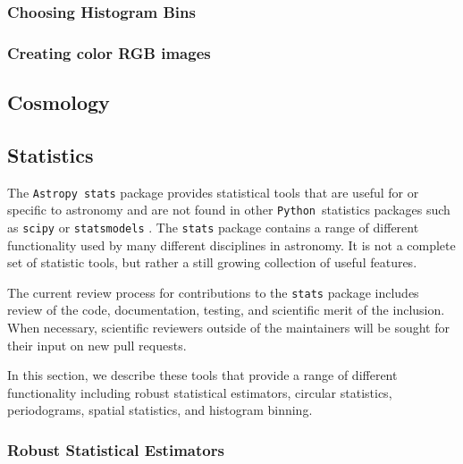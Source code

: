 \documentclass[modern]{aastex61}
\newcommand{\package}[1]{\texttt{#1}}
\newcommand{\python}{\package{Python}}
\newcommand{\astropypkg}{\package{Astropy}}
\begin{document}
\subsubsection{Choosing Histogram Bins}

\subsubsection{Creating color RGB images}


\subsection{Cosmology}


\subsection{Statistics}

The \astropypkg\ \package{stats} package provides
statistical tools that are useful for or specific to
astronomy and are not found in other \python\
statistics packages such as \package{scipy}
\citep{scipy} or \package{statsmodels}
\citep{seabold2010statsmodels}.   The
\package{stats} package contains a range of
different functionality used by many different
disciplines in astronomy.   It is not a complete set
of statistic tools, but rather a still growing
collection of useful features.

The current review process for contributions to the \package{stats} package includes review of the code, documentation, testing, and scientific merit of the inclusion.  When necessary, scientific reviewers outside of the maintainers will be sought for their input on new pull requests.

In this section, we describe these tools that provide a range of different functionality including robust statistical estimators, circular statistics, periodograms, spatial statistics, and histogram binning.




\subsubsection{Robust Statistical Estimators}
\end{document}
